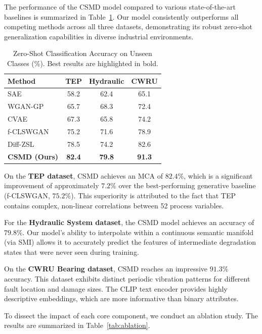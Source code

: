 \documentclass[journal,12pt,onecolumn]{IEEEtran}
\begin{document}
The performance of the CSMD model compared to various state-of-the-art baselines is summarized in Table~\ref{tab:comparison}. Our model consistently outperforms all competing methods across all three datasets, demonstrating its robust zero-shot generalization capabilities in diverse industrial environments.

\begin{table}[htbp]
\centering
\caption{Zero-Shot Classification Accuracy on Unseen Classes (\%). Best results are highlighted in bold.}
\label{tab:comparison}
\begin{tabular}{lccc}
\toprule
Method & TEP & Hydraulic & CWRU \\
\midrule
SAE & 58.2 & 62.4 & 65.1 \\
WGAN-GP & 65.7 & 68.3 & 72.4 \\
CVAE & 67.3 & 65.8 & 74.2 \\
f-CLSWGAN & 75.2 & 71.6 & 78.9 \\
Diff-ZSL & 78.5 & 74.2 & 82.6 \\
\textbf{CSMD (Ours)} & \textbf{82.4} & \textbf{79.8} & \textbf{91.3} \\
\bottomrule
\end{tabular}
\end{table}

On the \textbf{TEP dataset}, CSMD achieves an MCA of $82.4\%$, which is a significant improvement of approximately $7.2\%$ over the best-performing generative baseline (f-CLSWGAN, $75.2\%$). This superiority is attributed to the fact that TEP contains complex, non-linear correlations between 52 process variables.

For the \textbf{Hydraulic System dataset}, the CSMD model achieves an accuracy of $79.8\%$. Our model's ability to interpolate within a continuous semantic manifold (via SMI) allows it to accurately predict the features of intermediate degradation states that were never seen during training.

On the \textbf{CWRU Bearing dataset}, CSMD reaches an impressive $91.3\%$ accuracy. This dataset exhibits distinct periodic vibration patterns for different fault location and damage sizes. The CLIP text encoder provides highly descriptive embeddings, which are more informative than binary attributes.

To dissect the impact of each core component, we conduct an ablation study. The results are summarized in Table~\ref{tab:ablation}.
\end{document}
